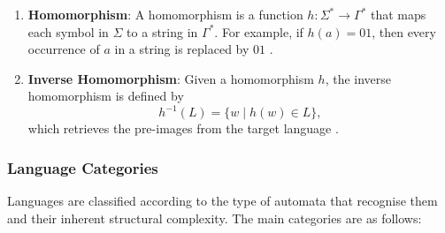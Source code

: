 \begin{enumerate}
    \item \textbf{Homomorphism}: A homomorphism is a function $h: \Sigma^\ast \to \Gamma^\ast$ that maps each symbol in $\Sigma$ to a string in $\Gamma^\ast$. For example, if $h(a) = 01$, then every occurrence of $a$ in a string is replaced by $01$ \cite{hopcroft2006introduction}.

    \item \textbf{Inverse Homomorphism}: Given a homomorphism $h$, the inverse homomorphism is defined by 
    \[
    h^{-1}(L) = \{w \mid h(w) \in L\},
    \]
    which retrieves the pre-images from the target language \cite{hopcroft2006introduction}.
\end{enumerate}

\subsubsection{Language Categories}
Languages are classified according to the type of automata that recognise them and their inherent structural complexity. The main categories are as follows:

